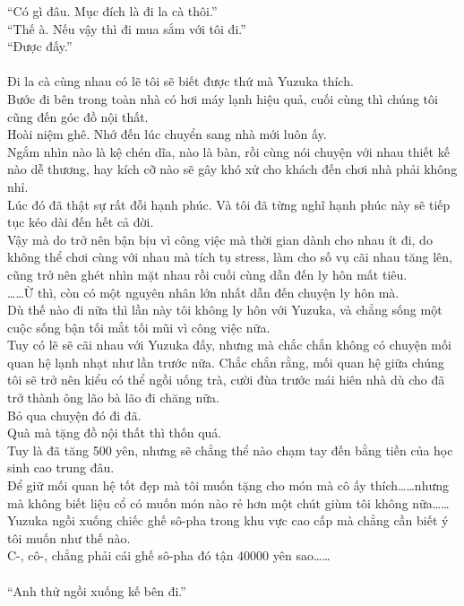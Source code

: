 \documentclass[12pt,a4paper, twosides]{book}
\begin{document}
“Có gì đâu. Mục đích là đi la cà thôi.”\\
“Thế à. Nếu vậy thì đi mua sắm với tôi đi.”\\
“Được đấy.”\\
\\
Đi la cà cùng nhau có lẽ tôi sẽ biết được thứ mà Yuzuka thích.\\
Bước đi bên trong toàn nhà có hơi máy lạnh hiệu quả, cuối cùng thì chúng tôi cũng đến góc đồ nội thất.\\
Hoài niệm ghê. Nhớ đến lúc chuyển sang nhà mới luôn ấy.\\
Ngắm nhìn nào là kệ chén dĩa, nào là bàn, rồi cùng nói chuyện với nhau thiết kế nào dễ thương, hay kích cỡ nào sẽ gây khó xử cho khách đến chơi nhà phải không nhỉ.\\
Lúc đó đã thật sự rất đỗi hạnh phúc. Và tôi đã từng nghĩ hạnh phúc này sẽ tiếp tục kéo dài đến hết cả đời.\\
Vậy mà do trở nên bận bịu vì công việc mà thời gian dành cho nhau ít đi, do không thể chơi cùng với nhau mà tích tụ stress, làm cho số vụ cãi nhau tăng lên, cũng trở nên ghét nhìn mặt nhau rồi cuối cùng dẫn đến ly hôn mất tiêu.\\
……Ừ thì, còn có một nguyên nhân lớn nhất dẫn đến chuyện ly hôn mà.\\
Dù thế nào đi nữa thì lần này tôi không ly hôn với Yuzuka, và chẳng sống một cuộc sống bận tối mắt tối mũi vì công việc nữa.\\
Tuy có lẽ sẽ cãi nhau với Yuzuka đấy, nhưng mà chắc chắn không có chuyện mối quan hệ lạnh nhạt như lần trước nữa. Chắc chắn rằng, mối quan hệ giữa chúng tôi sẽ trở nên kiểu có thể ngồi uống trà, cười đùa trước mái hiên nhà dù cho đã trở thành ông lão bà lão đi chăng nữa.\\
Bỏ qua chuyện đó đi đã.\\
Quà mà tặng đồ nội thất thì thốn quá.\\
Tuy là đã tăng 500 yên, nhưng sẽ chẳng thể nào chạm tay đến bằng tiền của học sinh cao trung đâu.\\
Để giữ mối quan hệ tốt đẹp mà tôi muốn tặng cho món mà cô ấy thích……nhưng mà không biết liệu cổ có muốn món nào rẻ hơn một chút giùm tôi không nữa……\\
Yuzuka ngồi xuống chiếc ghế sô-pha trong khu vực cao cấp mà chẳng cần biết ý tôi muốn như thế nào.\\
C-, cô-, chẳng phải cái ghế sô-pha đó tận 40000 yên sao……\\
\\
“Anh thử ngồi xuống kế bên đi.”\\
\end{document}
